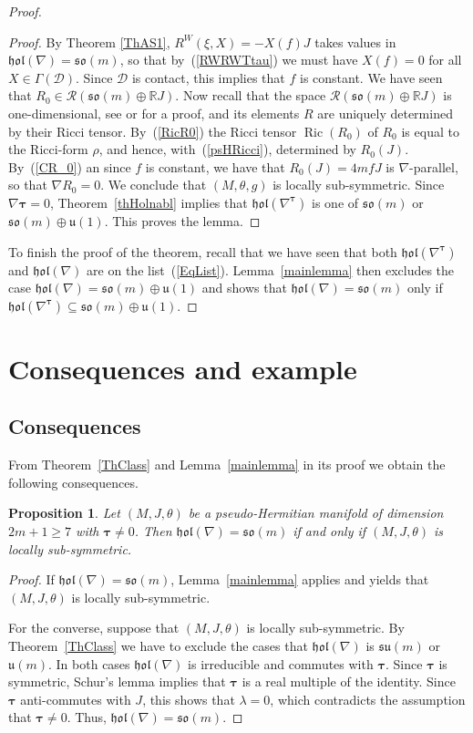 \documentclass{amsart}
\theoremstyle{plain}
\newtheorem{prop}[theorem]{Proposition}
\theoremstyle{definition}
\newcommand{\Ric}{\operatorname{Ric}}
\def\R{\mathcal{R}}
\def\so{\mathfrak{so}}
\def\su{\mathfrak{su}}
\def\u{\mathfrak{u}}
\newcommand{\hol}{\mathfrak{hol}}
\newcommand{\bt}{{\boldsymbol{\tau}}}
\newcommand{\Real}{\mathbb{R}}
\newcommand{\1}{\mathbf{1}}
\newcommand{\D}{{\mathcal D}}
\newcommand{\+}{\oplus}
\begin{document}
\begin{proof}
\begin{proof}
By Theorem \ref{ThAS1},
$R^W(\xi,X)=-X(f)J$ takes values in $\hol(\nabla)=\so(m)$, so that by~(\ref{RWRWTtau}) we must have  $X(f)=0$ for all $X\in \Gamma(\D)$. Since $\D$ is contact, this implies that $f$ is constant. We have seen that $R_0\in
\R(\so(m)\oplus \Real J)$. 
 Now recall that the space $\R(\so(m)\oplus \Real J)$ is one-dimensional, see \cite[Table 1]{C-S} or \cite{Salamon89} for a proof, and  its elements $R$ are uniquely determined by their Ricci tensor. By~(\ref{RicR0}) the Ricci tensor  $\Ric(R_0)$ of $R_0$  is equal to the Ricci-form $\rho$, and hence, with~(\ref{psHRicci}), determined by
$R_0(J)$. 
By~(\ref{CR_0}) an since $f$ is constant, we have that $R_0(J)=4mfJ$ is $\nabla$-parallel, so that $\nabla R_0=0$.
We conclude that  $(M,\theta,g)$ is locally sub-symmetric. 
Since $\nabla\bt =0$, Theorem~\ref{thHolnabl}  implies that $\hol(\nabla^\bt)$ is one of $\so(m)$ or $\so(m)\oplus\u(1)$. This proves the lemma. \end{proof}
To finish the proof of the theorem, recall that we have seen that both $\hol(\nabla^\bt)$ and $\hol(\nabla)$ are on the list~(\ref{EqList}). 
Lemma~\ref{mainlemma} then excludes the case $\hol(\nabla)=\so(m)\+\u(1)$ and shows that $\hol(\nabla)=\so(m)$ only if  $\hol(\nabla^\bt)\subseteq \so(m)\+\u(1)$.\end{proof}

 

 \section{Consequences and example}\label{SecCons}
 
 
 
 

 \subsection{Consequences}
 From Theorem~\ref{ThClass} and Lemma~\ref{mainlemma} in its proof we obtain the following consequences.
 
 \begin{prop}\label{PropSym} Let $(M,J,\theta)$ be a pseudo-Hermitian manifold of dimension $2m+1\geq 7$ with $\bt\neq 0$. Then $\hol(\nabla)=\so(m)$ if and only if $(M,J,\theta)$ is locally sub-symmetric. \end{prop}
 	
 
  \begin{proof} 
  If $\hol(\nabla)=\so(m)$, Lemma~\ref{mainlemma} applies and yields that $(M,J,\theta)$ is locally sub-symmetric.
  
For the converse, suppose that $(M,J,\theta)$ is locally sub-symmetric. By Theorem~\ref{ThClass} we have to exclude the cases that   $\hol(\nabla)$ is $\su(m)$ or $\u(m)$. In both cases  
  $\hol(\nabla)$ is irreducible and commutes with $\bt$. Since $\bt$  is symmetric,   Schur's lemma  implies that $\bt$ is a real multiple of the identity. Since $\bt$ anti-commutes 	with $J$, this shows that $\lambda=0$, which contradicts the assumption that $\bt\not=0$. Thus, $\hol(\nabla)=\so(m)$.  
 \end{proof}
 
\end{document}
